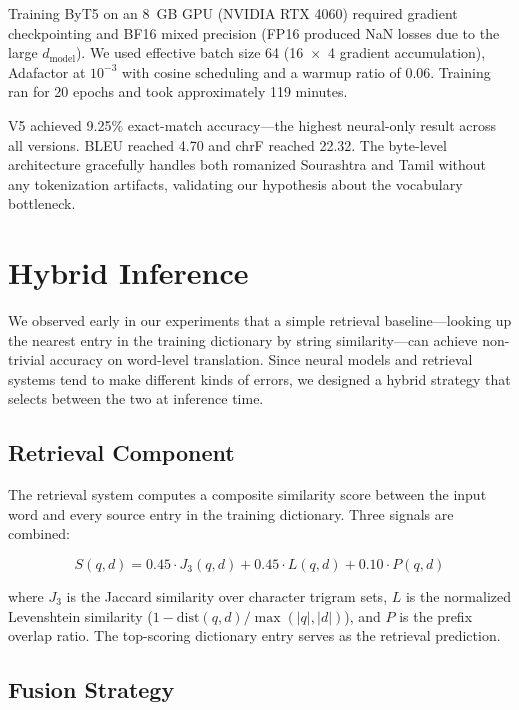 \documentclass[conference]{IEEEtran}
\begin{document}
Training ByT5 on an 8~GB GPU (NVIDIA RTX 4060) required gradient checkpointing and BF16 mixed precision (FP16 produced NaN losses due to the large $d_\text{model}$). We used effective batch size 64 (16~$\times$~4 gradient accumulation), Adafactor at $10^{-3}$ with cosine scheduling and a warmup ratio of 0.06. Training ran for 20 epochs and took approximately 119 minutes.

V5 achieved 9.25\% exact-match accuracy---the highest neural-only result across all versions. BLEU reached 4.70 and chrF reached 22.32. The byte-level architecture gracefully handles both romanized Sourashtra and Tamil without any tokenization artifacts, validating our hypothesis about the vocabulary bottleneck.

\section{Hybrid Inference}\label{sec:hybrid}

We observed early in our experiments that a simple retrieval baseline---looking up the nearest entry in the training dictionary by string similarity---can achieve non-trivial accuracy on word-level translation. Since neural models and retrieval systems tend to make different kinds of errors, we designed a hybrid strategy that selects between the two at inference time.

\subsection{Retrieval Component}

The retrieval system computes a composite similarity score between the input word and every source entry in the training dictionary. Three signals are combined:

\begin{equation}
S(q, d) = 0.45 \cdot J_3(q, d) + 0.45 \cdot L(q, d) + 0.10 \cdot P(q, d)
\label{eq:retrieval}
\end{equation}

\noindent where $J_3$ is the Jaccard similarity over character trigram sets, $L$ is the normalized Levenshtein similarity ($1 - \text{dist}(q,d)/\max(|q|,|d|)$), and $P$ is the prefix overlap ratio. The top-scoring dictionary entry serves as the retrieval prediction.

\subsection{Fusion Strategy}
\end{document}
